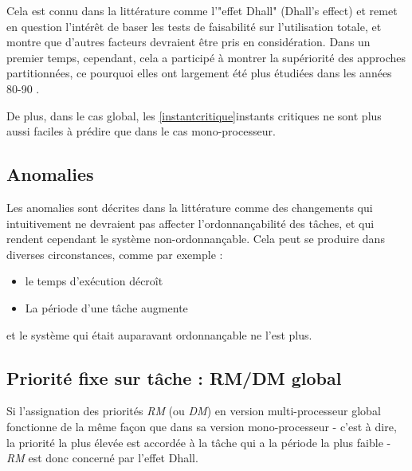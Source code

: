 \documentclass[11pt,a4paper,oneside]{report}
\begin{document}
	Cela est connu dans la littérature comme l'"effet Dhall" (Dhall's effect) et remet en 
	question l'intérêt de baser les tests de faisabilité sur l'utilisation totale, et 
	montre que d'autres facteurs devraient être pris en considération. Dans un premier temps, cependant, 
	cela a participé à montrer la supériorité des approches partitionnées, ce pourquoi elles ont 
	largement été plus étudiées dans les années 80-90 \cite{davis_survey_2011}.\medskip
	
	De plus, dans le cas global, les \ref{instantcritique}{instants critiques} ne sont plus aussi faciles à prédire 
	que dans le cas mono-processeur. \medskip
	
	\subsection{Anomalies}
	Les anomalies sont décrites dans la littérature comme des changements qui intuitivement ne devraient 
	pas affecter l'ordonnançabilité des tâches, et qui rendent cependant le système non-ordonnançable. 
	Cela peut se produire dans diverses circonstances, comme par exemple :\medskip
	\begin{itemize}
		\item le temps d'exécution décroît
		\item La période d'une tâche augmente
	\end{itemize}
	et le système qui était auparavant ordonnançable ne l'est plus.
	
	
	
	\subsection{Priorité fixe sur tâche : RM/DM global}
	Si l'assignation des priorités \textit{RM} (ou \textit{DM}) en version multi-processeur global 
	fonctionne de la même façon que dans sa version mono-processeur - 
	c'est à dire, la priorité la plus élevée est accordée à la tâche qui a la période la plus faible - 
	\textit{RM} est donc concerné par l'effet Dhall. \medskip
	
	
\end{document}

